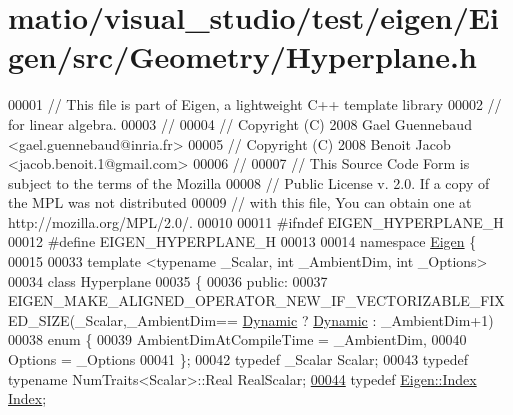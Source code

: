 \hypertarget{matio_2visual__studio_2test_2eigen_2_eigen_2src_2_geometry_2_hyperplane_8h_source}{}\section{matio/visual\+\_\+studio/test/eigen/\+Eigen/src/\+Geometry/\+Hyperplane.h}
\label{matio_2visual__studio_2test_2eigen_2_eigen_2src_2_geometry_2_hyperplane_8h_source}

\begin{DoxyCode}
00001 \textcolor{comment}{// This file is part of Eigen, a lightweight C++ template library}
00002 \textcolor{comment}{// for linear algebra.}
00003 \textcolor{comment}{//}
00004 \textcolor{comment}{// Copyright (C) 2008 Gael Guennebaud <gael.guennebaud@inria.fr>}
00005 \textcolor{comment}{// Copyright (C) 2008 Benoit Jacob <jacob.benoit.1@gmail.com>}
00006 \textcolor{comment}{//}
00007 \textcolor{comment}{// This Source Code Form is subject to the terms of the Mozilla}
00008 \textcolor{comment}{// Public License v. 2.0. If a copy of the MPL was not distributed}
00009 \textcolor{comment}{// with this file, You can obtain one at http://mozilla.org/MPL/2.0/.}
00010 
00011 \textcolor{preprocessor}{#ifndef EIGEN\_HYPERPLANE\_H}
00012 \textcolor{preprocessor}{#define EIGEN\_HYPERPLANE\_H}
00013 
00014 \textcolor{keyword}{namespace }\hyperlink{namespace_eigen}{Eigen} \{ 
00015 
00033 \textcolor{keyword}{template} <\textcolor{keyword}{typename} \_Scalar, \textcolor{keywordtype}{int} \_AmbientDim, \textcolor{keywordtype}{int} \_Options>
00034 \textcolor{keyword}{class }Hyperplane
00035 \{
00036 \textcolor{keyword}{public}:
00037   EIGEN\_MAKE\_ALIGNED\_OPERATOR\_NEW\_IF\_VECTORIZABLE\_FIXED\_SIZE(\_Scalar,\_AmbientDim==
      \hyperlink{namespace_eigen_ad81fa7195215a0ce30017dfac309f0b2}{Dynamic} ? \hyperlink{namespace_eigen_ad81fa7195215a0ce30017dfac309f0b2}{Dynamic} : \_AmbientDim+1)
00038   enum \{
00039     AmbientDimAtCompileTime = \_AmbientDim,
00040     Options = \_Options
00041   \};
00042   \textcolor{keyword}{typedef} \_Scalar Scalar;
00043   \textcolor{keyword}{typedef} \textcolor{keyword}{typename} NumTraits<Scalar>::Real RealScalar;
\hyperlink{group___geometry___module_a58d2307d16128a0026021374e9e10465}{00044}   \textcolor{keyword}{typedef} \hyperlink{namespace_eigen_a62e77e0933482dafde8fe197d9a2cfde}{Eigen::Index} \hyperlink{group___geometry___module_a58d2307d16128a0026021374e9e10465}{Index}; 

\end{DoxyCode}
